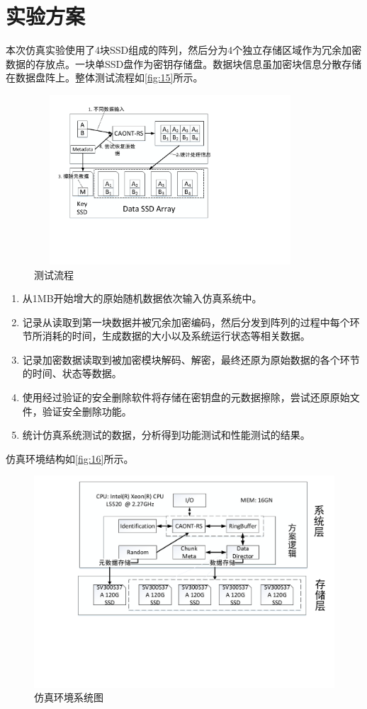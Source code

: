 \section{实验方案}
本次仿真实验使用了4块SSD组成的阵列，然后分为4个独立存储区域作为冗余加密数据的存放点。一块单SSD盘作为密钥存储盘。数据块信息虽加密块信息分散存储在数据盘阵上。整体测试流程如\autoref{fig:15}所示。
\begin{figure}[H]
	\centering
	\includegraphics[width=4in,height=2.5in]{Pics/test-pr.pdf}
	\caption{测试流程}
	\label{fig:15}
\end{figure}
\begin{enumerate}
	\item 从1MB开始增大的原始随机数据依次输入仿真系统中。
	\item 记录从读取到第一块数据并被冗余加密编码，然后分发到阵列的过程中每个环节所消耗的时间，生成数据的大小以及系统运行状态等相关数据。
	\item 记录加密数据读取到被加密模块解码、解密，最终还原为原始数据的各个环节的时间、状态等数据。
	\item 使用经过验证的安全删除软件将存储在密钥盘的元数据擦除，尝试还原原始文件，验证安全删除功能。
	\item 统计仿真系统测试的数据，分析得到功能测试和性能测试的结果。
\end{enumerate}
仿真环境结构如\autoref{fig:16}所示。
\begin{figure}[htb]
	\centering
	\includegraphics[width=1\textwidth]{Pics/test-env.pdf}
	\caption{仿真环境系统图}
	\label{fig:16}
\end{figure}
